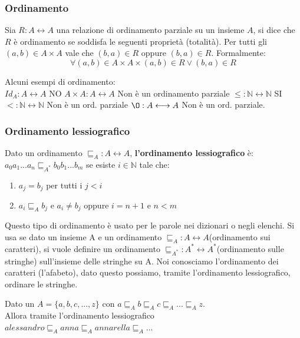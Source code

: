 \subsubsection{Ordinamento}
\begin{definition}[Ordinamento]
    Sia $R: A \leftrightarrow A$ una relazione di ordinamento parziale su un insieme $A$, si dice che $R$ è ordinamento se soddisfa le seguenti proprietà (totalità). Per tutti gli $(a,b) \in A \times A$ vale che $(b,a) \in R$ oppure $(b,a) \in R$. Formalmente:
    \begin{equation}
        \forall (a,b) \in A \times A \times (a,b) \in R \lor (b,a) \in R
    \end{equation}
\end{definition}
\begin{example}
Alcuni esempi di ordinamento:\\
$Id_A: A \longleftrightarrow A$ NO \hspace{.5cm} $A \times A: A \longleftrightarrow A$ Non è un ordinamento parziale  \hspace{.5cm} $\leq: \mathbb{N} \longleftrightarrow \mathbb{N}$ SI \\
$<: \mathbb{N} \longleftrightarrow \mathbb{N}$ Non è un ord. parziale \hspace{.7cm} $\O: A \longleftrightarrow A$ Non è un ord. parziale.
\end{example}

\subsubsection{Ordinamento lessiografico}
\begin{definition}
    Dato un ordinamento $\sqsubseteq_A: A \longleftrightarrow A$, \textbf{l'ordinamento lessiografico} è: $a_0a_1... a_n \sqsubseteq_{A^*} b_0b_1...b_m$ se esiste $i \in \mathbb{N}$ tale che:
    \begin{enumerate}
        \item $a_j = b_j$ per tutti i $j < i$
        \item $a_i \sqsubseteq_A b_j$ e $a_i \neq b_j$ oppure $i = n+1$ e $n < m$
    \end{enumerate}
\end{definition}
Questo tipo di ordinamento è usato per le parole nei dizionari o negli elenchi. Si usa se dato un insieme A e un ordinamento $\sqsubseteq_A: A \longleftrightarrow A$(ordinamento sui caratteri), si vuole definire un ordinamento $\sqsubseteq_{A^*}: A^* \longleftrightarrow A^*$(ordinamento sulle stringhe) sull'insieme delle stringhe su A.
Noi conosciamo l'ordinamento dei caratteri (l'afabeto), dato questo possiamo, tramite l'ordinamento lessiografico, ordinare le stringhe.
\begin{example}
Dato un $A = \{a,b,c,...,z\}$ con $a \sqsubseteq_A b \sqsubseteq_A c \sqsubseteq_A ... \sqsubseteq_A z$.\\
Allora tramite l'ordinamento lessiografico $alessandro \sqsubseteq_A anna \sqsubseteq_A annarella \sqsubseteq_A ...$
\end{example}
